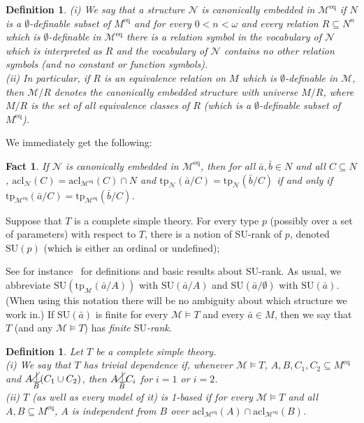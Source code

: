 \documentclass[11pt, twoside]{amsart}
\newtheorem{defin}[theor]{Definition}
\newtheorem{fact}[theor]{Fact}
\numberwithin{equation}{section}
\newcommand{\tp}{\mathrm{tp}}
\newcommand{\acl}{\mathrm{acl}}
\newcommand{\es}{\emptyset}
\newcommand{\su}{\mathrm{SU}}
\newcommand{\meq}{^{\mathrm{eq}}}
\newcommand{\mcM}{\mathcal{M}}
\newcommand{\mcN}{\mathcal{N}}
\newcommand{\nind}{\raisebox{-2pt}[5pt][0pt]{$\smile$} 
\hspace*{-6.8pt}\raisebox{3pt}[5pt][0pt]{$|$}\hspace*{-6.8pt}
\raisebox{3pt}[5pt][0pt]{$\diagup$} }
\begin{document}
\begin{defin}\label{definition of canonically embedded structure}{\rm
(i) We say that a structure $\mcN$ is {\em canonically embedded} in $\mcM\meq$ if $N$ is a $\es$-definable subset of $M\meq$ and
for every $0 < n < \omega$ and every relation $R \subseteq N^n$ which is $\es$-definable in $\mcM\meq$ there is a
relation symbol in the vocabulary of $\mcN$ which is interpreted as $R$ and the vocabulary of $\mcN$ contains no other relation symbols
(and no constant or function symbols).\\
(ii) In particular, if $R$ is an equivalence relation on $M$ which is $\es$-definable in $\mcM$,
then $\mcM/R$ denotes the canonically embedded structure with universe $M/R$, 
where $M/R$ is the set of all equivalence classes of $R$ (which is a $\es$-definable subset of $M\meq$).
}\end{defin}

\noindent
We immediately get the following:

\begin{fact}\label{first fact about canonically embedded structures}
If $\mcN$ is canonically embedded in $\mcM\meq$, then for all $\bar{a}, \bar{b} \in N$ and all $C \subseteq N$,
$\acl_\mcN(C) = \acl_{\mcM\meq}(C) \cap N$ and
$\tp_\mcN(\bar{a} / C) = \tp_\mcN(\bar{b} / C)$ if and only if $\tp_{\mcM\meq}(\bar{a} / C) = \tp_{\mcM\meq}(\bar{b} / C)$. 
\end{fact}


\noindent
Suppose that $T$ is a complete simple theory. 
For every type $p$ (possibly over a set of parameters) with respect to $T$, there is a notion of SU-rank of $p$, denoted $\su(p)$
(which is either an ordinal or undefined);

See for instance~\cite{Cas, Wag} for definitions and basic results about SU-rank. 
As usual, we abbreviate $\su(\tp_\mcM(\bar{a} / A))$ with $\su(\bar{a} / A)$
and $\su(\bar{a} / \es)$ with $\su(\bar{a})$.
(When using this notation there will be no ambiguity about which structure we work in.)
If $\su(\bar{a})$ is finite for every $\mcM \models T$ and every $\bar{a} \in M$, then we say that $T$ (and any $\mcM \models T$) has {\em finite $\su$-rank}. 


\begin{defin}\label{definition of trivial dependence}{\rm
Let $T$ be a complete simple theory.\\
(i) We say that  $T$ has {\em trivial dependence} if, whenever $\mcM \models T$,
$A, B, C_1, C_2 \subseteq M\meq$ and $A \underset{B}{\nind} (C_1 \cup C_2)$, 
then $A \underset{B}{\nind} C_i$ for $i = 1$ or $i = 2$.\\
(ii) $T$ (as well as every model of it) is {\em 1-based} if for every $\mcM \models T$ and all $A, B \subseteq M\meq$, 
$A$ is independent from $B$ over $\acl_{\mcM\meq}(A) \cap \acl_{\mcM\meq}(B)$.
}\end{defin}
\end{document}
